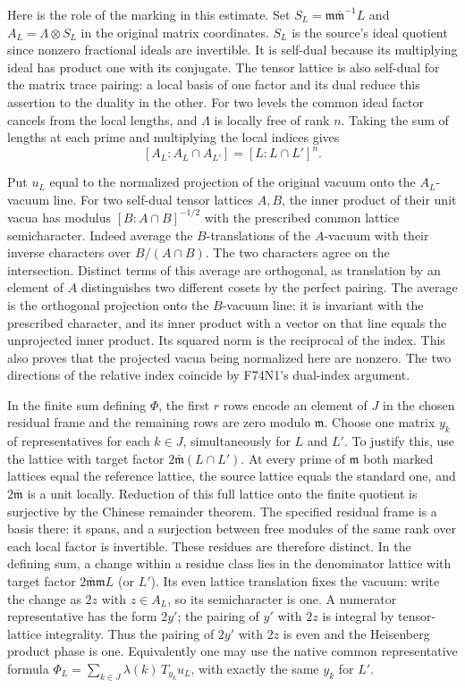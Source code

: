 Here is the role of the marking in this estimate. Set
$S_L=\mathfrak m\bar{\mathfrak m}^{-1}L$ and
$A_L=\Lambda\otimes S_L$ in the original matrix coordinates.
$S_L$ is the source's ideal quotient since nonzero fractional
ideals are invertible. It is self-dual because its multiplying
ideal has product one with its conjugate. The tensor lattice is
also self-dual for the matrix trace pairing: a local basis of one
factor and its dual reduce this assertion to the duality in the
other. For two levels the common ideal factor cancels from the
local lengths, and $\Lambda$ is locally free of rank $n$.
Taking the sum of lengths at each prime and multiplying the local
indices gives
\[
          [A_L:A_L\cap A_{L'}]=[L:L\cap L']^n.
\]

Put $u_L$ equal to the normalized projection of the original
vacuum onto the $A_L$-vacuum line. For two self-dual tensor
lattices $A,B$, the inner product of their unit vacua has modulus
$[B:A\cap B]^{-1/2}$ with the prescribed common lattice
semicharacter. Indeed average the $B$-translations of the
$A$-vacuum with their inverse characters over $B/(A\cap B)$.
The two characters agree on the intersection. Distinct terms of
this average are orthogonal, as translation by an element of $A$
distinguishes two different cosets by the perfect pairing.
The average is the orthogonal projection onto the $B$-vacuum
line: it is invariant with the prescribed character, and its
inner product with a vector on that line equals the unprojected
inner product. Its squared norm is the reciprocal of the index.
This also proves that the projected vacua being normalized here
are nonzero. The two directions of the relative index coincide by
F74N1's dual-index argument.

In the finite sum defining $\Phi$, the first $r$ rows encode an
element of $J$ in the chosen residual frame and the remaining rows
are zero modulo $\mathfrak m$. Choose one matrix $y_k$ of representatives
for each $k\in J$, simultaneously for $L$ and $L'$. To justify
this, use the lattice with target factor
$2\bar{\mathfrak m}(L\cap L')$. At every prime of $\mathfrak m$
both marked lattices equal the reference lattice, the source
lattice equals the standard one, and $2\bar{\mathfrak m}$ is a
unit locally. Reduction of this full lattice onto the finite
quotient is surjective by the Chinese remainder theorem. The
specified residual frame is a basis there: it spans, and a
surjection between free modules of the same rank over each local
factor is invertible. These residues are therefore distinct.
In the defining sum, a change within a residue class lies in
the denominator lattice with target factor
$2\bar{\mathfrak m}\mathfrak mL$ (or $L'$). Its even lattice
translation fixes the vacuum: write the change as $2z$ with
$z\in A_L$, so its semicharacter is one. A numerator representative
has the form $2y'$; the pairing of $y'$ with $2z$ is integral
by tensor-lattice integrality. Thus the pairing of $2y'$ with $2z$
is even and the Heisenberg product phase is one. Equivalently one may
use the native common representative formula
$\Phi_L=\sum_{k\in J}\lambda(k)\,T_{y_k}u_L$, with exactly the
same $y_k$ for $L'$.

